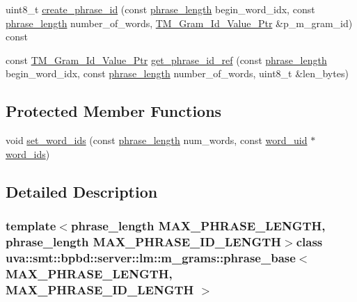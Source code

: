 \begin{DoxyCompactItemize}
\item 
uint8\+\_\+t \hyperlink{classuva_1_1smt_1_1bpbd_1_1server_1_1lm_1_1m__grams_1_1phrase__base_ab5fe0d479fa9abbea371bfdf5f728802}{create\+\_\+phrase\+\_\+id} (const \hyperlink{namespaceuva_1_1smt_1_1bpbd_1_1server_af068a19c2e03116caf3e3827a3e40e35}{phrase\+\_\+length} begin\+\_\+word\+\_\+idx, const \hyperlink{namespaceuva_1_1smt_1_1bpbd_1_1server_af068a19c2e03116caf3e3827a3e40e35}{phrase\+\_\+length} number\+\_\+of\+\_\+words, \hyperlink{namespaceuva_1_1smt_1_1bpbd_1_1server_1_1lm_1_1m__grams_1_1m__gram__id_aa605051ded9336178d905e9581702378}{T\+M\+\_\+\+Gram\+\_\+\+Id\+\_\+\+Value\+\_\+\+Ptr} \&p\+\_\+m\+\_\+gram\+\_\+id) const 
\item 
const \hyperlink{namespaceuva_1_1smt_1_1bpbd_1_1server_1_1lm_1_1m__grams_1_1m__gram__id_aa605051ded9336178d905e9581702378}{T\+M\+\_\+\+Gram\+\_\+\+Id\+\_\+\+Value\+\_\+\+Ptr} \hyperlink{classuva_1_1smt_1_1bpbd_1_1server_1_1lm_1_1m__grams_1_1phrase__base_af90235927d603b9b986c88e6c4b8b90a}{get\+\_\+phrase\+\_\+id\+\_\+ref} (const \hyperlink{namespaceuva_1_1smt_1_1bpbd_1_1server_af068a19c2e03116caf3e3827a3e40e35}{phrase\+\_\+length} begin\+\_\+word\+\_\+idx, const \hyperlink{namespaceuva_1_1smt_1_1bpbd_1_1server_af068a19c2e03116caf3e3827a3e40e35}{phrase\+\_\+length} number\+\_\+of\+\_\+words, uint8\+\_\+t \&len\+\_\+bytes)
\end{DoxyCompactItemize}
\subsection*{Protected Member Functions}
\begin{DoxyCompactItemize}
\item 
void \hyperlink{classuva_1_1smt_1_1bpbd_1_1server_1_1lm_1_1m__grams_1_1phrase__base_a5e459020950db963fbf36c0700693995}{set\+\_\+word\+\_\+ids} (const \hyperlink{namespaceuva_1_1smt_1_1bpbd_1_1server_af068a19c2e03116caf3e3827a3e40e35}{phrase\+\_\+length} num\+\_\+words, const \hyperlink{namespaceuva_1_1smt_1_1bpbd_1_1server_a6bfe45ba344d65a7fdd7d26156328ddc}{word\+\_\+uid} $\ast$\hyperlink{classuva_1_1smt_1_1bpbd_1_1server_1_1lm_1_1m__grams_1_1phrase__base_a5dc6f9171cf46eb946e30595a24f7d0e}{word\+\_\+ids})
\end{DoxyCompactItemize}


\subsection{Detailed Description}
\subsubsection*{template$<$phrase\+\_\+length M\+A\+X\+\_\+\+P\+H\+R\+A\+S\+E\+\_\+\+L\+E\+N\+G\+T\+H, phrase\+\_\+length M\+A\+X\+\_\+\+P\+H\+R\+A\+S\+E\+\_\+\+I\+D\+\_\+\+L\+E\+N\+G\+T\+H$>$class uva\+::smt\+::bpbd\+::server\+::lm\+::m\+\_\+grams\+::phrase\+\_\+base$<$ M\+A\+X\+\_\+\+P\+H\+R\+A\+S\+E\+\_\+\+L\+E\+N\+G\+T\+H, M\+A\+X\+\_\+\+P\+H\+R\+A\+S\+E\+\_\+\+I\+D\+\_\+\+L\+E\+N\+G\+T\+H $>$}

